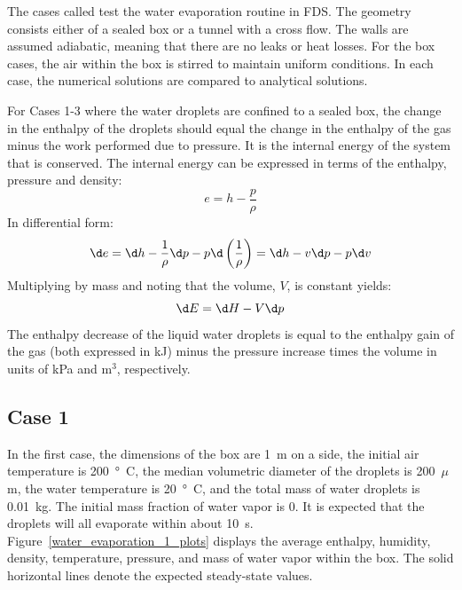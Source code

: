 \documentclass[11pt]{book}
\begin{document}
The cases called  test the water evaporation routine in FDS. The geometry consists either of
a sealed box or a tunnel with a cross flow. The walls are assumed adiabatic, meaning that there are no leaks or heat losses.
For the box cases, the air within the box is stirred to maintain uniform conditions.
In each case, the numerical solutions are compared to analytical solutions.

For Cases 1-3 where the water droplets are confined to a sealed box, the change in the enthalpy of the droplets should equal the change in the enthalpy of the gas minus the work
performed due to pressure. It is the internal energy of the system that is conserved. The internal energy can be expressed in terms of the
enthalpy, pressure and density:
\begin{equation} e = h - \frac{p}{\rho} \end{equation}
In differential form:
\begin{equation} \d e = \d h - \frac{1}{\rho} \d p - p \d \left(\frac{1}{\rho} \right) = \d h - v \d p - p \d v \end{equation}
Multiplying by mass and noting that the volume, $V$, is constant yields:
\begin{equation} \d E = \d H - V \d p \end{equation}
The enthalpy
decrease of the liquid water droplets is equal to the enthalpy gain of the gas (both expressed in kJ) minus the
pressure increase times the volume in
units of kPa and m$^3$, respectively.

\subsection{Case 1}
\label{water_evaporation_1}

In the first case, the dimensions of the box are 1~m on a side, the initial
air temperature is 200~\si{\degree C}, the median volumetric diameter of the droplets is 200~$\mu$m, the water temperature is 20~\si{\degree C}, and the total
mass of water droplets is 0.01~kg. The initial mass fraction of water vapor is 0.
It is expected that the droplets will all evaporate within about 10~s.
Figure~\ref{water_evaporation_1_plots} displays
the average enthalpy, humidity, density, temperature, pressure, and mass of water vapor within the box.
The solid horizontal lines denote the expected steady-state values.
\end{document}
